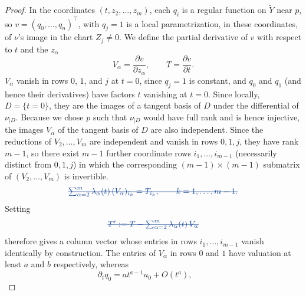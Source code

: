 \documentclass[11pt]{amsart}
\numberwithin{equation}{section}
\theoremstyle{plain}
\theoremstyle{remark}
\begin{document}
\begin{proof}
In the coordinates $(t,z_2,\ldots,z_m)$, each $q_i$ is a regular function
on $\widetilde Y$ near $p$, so $v=(q_0,\ldots,q_n)^\top$, with $q_j = 1$  is a local
parametrization, in these coordinates, of $\nu$'s image in the chart
$Z_j\ne0$.
We define the partial derivative of $v$ with respect to $t$ and the $z_\alpha$
\[ V_\alpha=\frac{\partial v}{\partial z_\alpha},\qquad
 T=\frac{\partial v}{\partial t}. \]
$V_\alpha$ vanish in rows $0$, $1$, and $j$ at $t = 0$, since $q_j = 1$ is constant, and $q_0$ and $q_1$ (and hence their derivatives) have factors $t$ vanishing at $t=0$. Since locally, $D = \{t=0\}$, they are
the images of a tangent basis of $D$ under the differential of $\nu_{|D}.$ Because we chose $p$ such that $\nu_{|D}$ would have full rank and is hence injective, the images $V_\alpha$ of the tangent basis of $D$ are also independent.
Since the reductions of $V_2,\ldots,V_m$ are independent and vanish in
rows $0,1,j$, they have rank $m-1$, so there exist $m-1$ further
coordinate rows $i_1,\ldots,i_{m-1}$ (necessarily distinct from $0,1,j$) in
which the corresponding $(m-1)\times(m-1)$ submatrix of $(V_2,\ldots,V_m)$
is invertible. 
\[\AIremove{\sum_{\alpha=2}^m \lambda_\alpha(t)\,(V_\alpha)_{i_k} = T_{i_k},
 \qquad k=1,\ldots,m-1.}\]
\AIadd{\[(V_\alpha)_{i_k}=\delta_{\alpha,k+1},\qquad
 T_{i_k}=c_{k+1},\qquad k=1,\ldots,m-1.\]}
Setting
\[ \AIremove{T' := T - \sum_{\alpha=2}^m \lambda_\alpha(t)\,V_\alpha}\]
\AIadd{\[T' := T - \sum_{\alpha=2}^m c_\alpha\,V_\alpha.\]}
therefore gives a column vector whose entries in rows
$i_1,\ldots,i_{m-1}$ vanish identically by construction.
 The entries of $V_\alpha$ in rows $0$ and $1$ have valuation at least $a$ and $b$ respectively, whereas
\[ \partial_tq_0=a t^{a-1}u_0+O(t^a),\qquad
\]
\end{proof}
\end{document}
